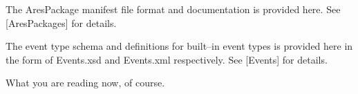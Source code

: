 The AresPackage manifest file format and documentation is provided here. See [AresPackages] for details.

\startnarrower[3*left]
\stopnarrower


The event type schema and definitions for built--in event types is provided here in the form of Events.xsd and Events.xml respectively. See [Events] for details.


What you are reading now, of course.
\stopitemize

